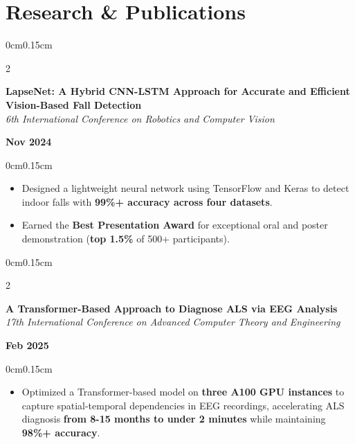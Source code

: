 \documentclass[10pt, letterpaper]{article}
\newenvironment{highlights}{
    \begin{itemize}[topsep=0pt, parsep=0pt, partopsep=0pt, itemsep=0pt, leftmargin=0.6cm]
}{
    \end{itemize}
}
\newenvironment{onecolentry}{
    \begin{adjustwidth}{0cm}{0.15cm}
}{
    \end{adjustwidth}
}
\newenvironment{twocolentry}[2][]{
    \onecolentry
    \def\secondColumn{#2}
    \setcolumnwidth{\fill, 4cm}
    \begin{paracol}{2}
}{
    \switchcolumn \raggedleft \secondColumn
    \end{paracol}
    \endonecolentry
}
\begin{document}
    \vspace{0.05cm}
    \section{Research \& Publications}
    \vspace{0.1cm}

    \begin{twocolentry}{\textbf{Nov 2024}}
        \textbf{LapseNet: A Hybrid CNN-LSTM Approach for Accurate and Efficient Vision-Based Fall Detection} \\
        \textit{6th International Conference on Robotics and Computer Vision}
    \end{twocolentry}
    \vspace{-0.05cm}
    \begin{onecolentry}
        \begin{highlights}
            \item Designed a lightweight neural network using TensorFlow and Keras to detect indoor falls with \textbf{99\%+ accuracy across four datasets}.
            \item Earned the \textbf{Best Presentation Award} for exceptional oral and poster demonstration (\textbf{top 1.5\%} of 500+ participants).
        \end{highlights}
    \end{onecolentry}

    \vspace{0.05cm}

    \begin{twocolentry}{\textbf{Feb 2025}}
        \textbf{A Transformer-Based Approach to Diagnose ALS via EEG Analysis} \\
        \textit{17th International Conference on Advanced Computer Theory and Engineering}
    \end{twocolentry}
    \vspace{-0.05cm}
    \begin{onecolentry}
        \begin{highlights}
            \item Optimized a Transformer-based model on \textbf{three A100 GPU instances} to capture spatial-temporal dependencies in EEG recordings, accelerating ALS diagnosis \textbf{from 8-15 months to under 2 minutes} while maintaining \textbf{98\%+ accuracy}.
        \end{highlights}
    \end{onecolentry}
\end{document}
